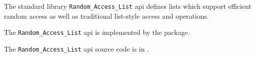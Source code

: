 
The standard library {\tt Random\_Access\_List} api defines lists which support efficient 
random access as well as traditional list-style access and operations.

The {\tt Random\_Access\_List} api is implemented by the  package.

The {\tt Random\_Access\_List} api source code is in .





